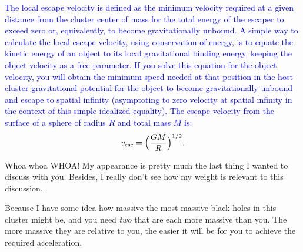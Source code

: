 \documentclass[main.tex]{subfiles}
\begin{document}
\begin{tcolorbox}[sharp corners, colback=blue!30, colframe=blue!80!blue, title=Escape Velocity]
\par \textcolor{blue} {The local escape velocity is defined as the minimum velocity required at a given distance from the cluster center of mass for the total energy of the escaper to exceed zero or, equivalently, to become gravitationally unbound.  A simple way to calculate the local escape velocity, using conservation of energy, is to equate the kinetic energy of an object to its local gravitational binding energy, keeping the object velocity as a free parameter.  If you solve this equation for the object velocity, you will obtain the minimum speed needed at that position in the host cluster gravitational potential for the object to become gravitationally unbound and escape to spatial infinity (asymptoting to zero velocity at spatial infinity in the context of this simple idealized equality). The escape velocity from the surface of a sphere of radius $R$ and total mass $M$ is:
\begin{equation}
\label{eqn:vesc}
v_{\rm esc} = \Big( \frac{GM}{R} \Big)^{1/2}.
\end{equation}
} 
\end{tcolorbox} 

\par \Sterope Whoa whoa WHOA!  My appearance is pretty much the last thing I wanted to discuss with you.  Besides, I really don't see how my weight is relevant to this discussion...

\par \Enrico Because I have some idea how massive the most massive black holes in this cluster might be, and you need \textit{two} that are each more massive than you.  The more massive they are relative to you, the easier it will be for you to achieve the required acceleration.
\end{document}
